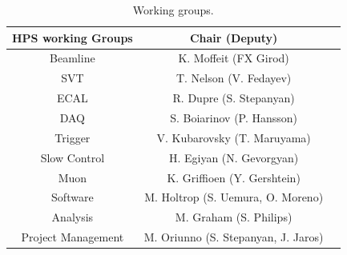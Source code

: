 \begin{table}[htdp]
\caption{Working groups.}
\begin{center}
\begin{tabular}{|c|c|c|}
\hline
HPS working Groups	& Chair (Deputy)\\
\hline\hline
Beamline	&K. Moffeit (FX Girod)\\
\hline
SVT	&T. Nelson (V. Fedayev)\\
\hline
ECAL	& R. Dupre (S. Stepanyan)\\
\hline
DAQ	 & S. Boiarinov (P. Hansson)\\
\hline
Trigger &	V. Kubarovsky (T. Maruyama)\\
\hline
Slow Control	& H. Egiyan (N. Gevorgyan)\\
\hline
Muon &	K. Griffioen (Y. Gershtein)\\
\hline
Software	& M. Holtrop (S. Uemura, O. Moreno)\\
\hline
Analysis &	M. Graham (S. Philips)\\
\hline
Project Management &	M. Oriunno (S. Stepanyan, J. Jaros)\\
\hline
\end{tabular}
\end{center}
\label{tb:groups}
\end{table}%

